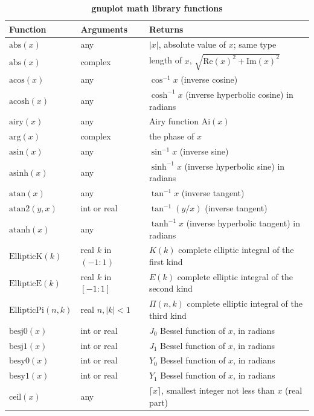 \documentclass[
  hyper, 
  lang = cn, 
  class = l3doc,
  classOption={11pt},
  sect = {load=false},
]{../../zlatex/code/ztex}
\begin{document}
\begin{center}
  \begin{longtable}{lll}
    \caption{\textbf{gnuplot math library functions}}\\
    \toprule
    \textbf{Function} & \textbf{Arguments} & \textbf{Returns} \\
    \midrule
    \(\text{abs}(x)\) & any & $|x|$, absolute value of $x$; same type \\
    \(\text{abs}(x)\) & complex & length of $x$, $\sqrt{\text{Re}(x)^2 + \text{Im}(x)^2}$ \\
    \(\text{acos}(x)\) & any & $\cos^{-1} x$ (inverse cosine) \\
    \(\text{acosh}(x)\) & any & $\cosh^{-1} x$ (inverse hyperbolic cosine) in radians \\
    \(\text{airy}(x)\) & any & Airy function $\text{Ai}(x)$ \\
    \(\text{arg}(x)\) & complex & the phase of $x$ \\
    \(\text{asin}(x)\) & any & $\sin^{-1} x$ (inverse sine) \\
    \(\text{asinh}(x)\) & any & $\sinh^{-1} x$ (inverse hyperbolic sine) in radians \\
    \(\text{atan}(x)\) & any & $\tan^{-1} x$ (inverse tangent) \\
    \(\text{atan2}(y,x)\) & int or real & $\tan^{-1}(y/x)$ (inverse tangent) \\
    \(\text{atanh}(x)\) & any & $\tanh^{-1} x$ (inverse hyperbolic tangent) in radians \\
    \(\text{EllipticK}(k)\) & real  $k$ in $(-1:1)$ & $K(k)$ complete elliptic integral of the first kind \\
    \(\text{EllipticE}(k)\) & real  $k$ in $[-1:1]$ & $E(k)$ complete elliptic integral of the second kind \\
    \(\text{EllipticPi}(n,k)\) & real $n,|k|<1$ & $\Pi(n,k)$ complete elliptic integral of the third kind \\
    \(\text{besj0}(x)\) & int or real & $J_0$ Bessel function of $x$, in radians \\
    \(\text{besj1}(x)\) & int or real & $J_1$ Bessel function of $x$, in radians \\
    \(\text{besy0}(x)\) & int or real & $Y_0$ Bessel function of $x$, in radians \\
    \(\text{besy1}(x)\) & int or real & $Y_1$ Bessel function of $x$, in radians \\
    \(\text{ceil}(x)\) & any & $\lceil x \rceil$, smallest integer not less than $x$ (real part) \\

\end{longtable}
\end{center}
\end{document}
